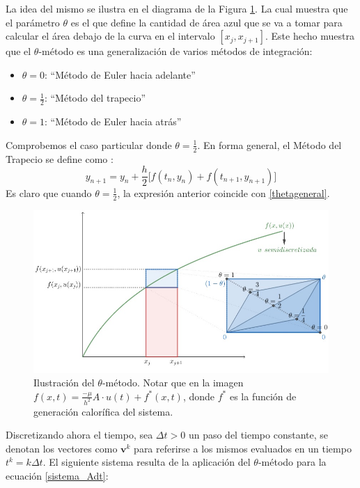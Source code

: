 \documentclass{endm}
\begin{document}
La idea del mismo se ilustra en el diagrama de la Figura \ref{fig:Diagrama}. La cual muestra que el parámetro $\theta$ es el que define la cantidad de área azul que se va a tomar para calcular el área debajo de la curva en el intervalo $[x_j,x_{j+1}]$. Este hecho muestra que el $\theta$-m\'etodo es una generalización de varios métodos de integración:
\begin{itemize}
    \item $\theta=0$: “Método de Euler hacia adelante”
    \item $\theta=\frac{1}{2}$: “Método del trapecio”
    \item $\theta=1$: “Método de Euler hacia atrás”
\end{itemize}
Comprobemos el caso particular donde $\theta=\frac{1}{2}$. En forma general, el Método del Trapecio se define como \cite[p.111]{notasteo}:
\begin{equation*}
    y_{n+1}=y_n+\frac{h}{2}\bigg[f(t_n,y_n)+f(t_{n+1},y_{n+1})\bigg]
\end{equation*}
Es claro que cuando $\theta=\frac{1}{2}$, la expresión anterior coincide con \ref{thetageneral}.
\begin{figure}[htp]
    \centering
    \includegraphics[width=15cm]{Diagrama}
    \caption{Ilustración del $\theta$-m\'etodo. Notar que en la imagen $f(x,t)=\frac{-\mu}{h^2}A\cdot u(t)+f^*(x,t)$, donde $f^*$ es la función de generación calorífica del sistema.}
    \label{fig:Diagrama}
\end{figure}

Discretizando ahora el tiempo, sea $\Delta t > 0$ un paso del tiempo constante, se denotan los vectores como $\textbf{v}^{k}$ para referirse a los mismos evaluados en un tiempo $t^{k} = k \Delta t$. El siguiente sistema resulta de la aplicaci\'on del $\theta$-m\'etodo para la ecuaci\'on \ref{sistema_Adt}:
\end{document}
